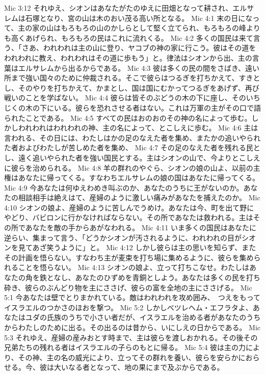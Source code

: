 Mic 3:12  それゆえ、シオンはあなたがたのゆえに田畑となって耕され、エルサレムは石塚となり、宮の山は木のおい茂る高い所となる。
Mic 4:1  末の日になって、主の家の山はもろもろの山のかしらとして堅く立てられ、もろもろの峰よりも高くあげられ、もろもろの民はこれに流れくる。
Mic 4:2  多くの国民は来て言う、「さあ、われわれは主の山に登り、ヤコブの神の家に行こう。彼はその道をわれわれに教え、われわれはその道に歩もう」と。律法はシオンから出、主の言葉はエルサレムから出るからである。
Mic 4:3  彼は多くの民の間をさばき、遠い所まで強い国々のために仲裁される。そこで彼らはつるぎを打ちかえて、すきとし、そのやりを打ちかえて、かまとし、国は国にむかってつるぎをあげず、再び戦いのことを学ばない。
Mic 4:4  彼らは皆そのぶどうの木の下に座し、そのいちじくの木の下にいる。彼らを恐れさせる者はない。これは万軍の主がその口で語られたことである。
Mic 4:5  すべての民はおのおのその神の名によって歩む。しかしわれわれはわれわれの神、主の名によって、とこしえに歩む。
Mic 4:6  主は言われる、その日には、わたしはかの足のなえた者を集め、またかの追いやられた者およびわたしが苦しめた者を集め、
Mic 4:7  その足のなえた者を残れる民とし、遠く追いやられた者を強い国民とする。主はシオンの山で、今よりとこしえに彼らを治められる。
Mic 4:8  羊の群れのやぐら、シオンの娘の山よ、以前の主権はあなたに帰ってくる。すなわちエルサレムの娘の国はあなたに帰ってくる。
Mic 4:9  今あなたは何ゆえわめき叫ぶのか、あなたのうちに王がないのか。あなたの相談相手は絶えはて、産婦のように激しい痛みがあなたを捕えたのか。
Mic 4:10  シオンの娘よ、産婦のように苦しんでうめけ。あなたは今、町を出て野にやどり、バビロンに行かなければならない。その所であなたは救われる。主はその所であなたを敵の手からあがなわれる。
Mic 4:11  いま多くの国民はあなたに逆らい、集まって言う、「どうかシオンが汚されるように、われわれの目がシオンを見てあざ笑うように」と。
Mic 4:12  しかし彼らは主の思いを知らず、またその計画を悟らない。すなわち主が麦束を打ち場に集めるように、彼らを集められることを悟らない。
Mic 4:13  シオンの娘よ、立って打ちこなせ。わたしはあなたの角を鉄となし、あなたのひずめを青銅としよう。あなたは多くの民を打ち砕き、彼らのぶんどり物を主にささげ、彼らの富を全地の主にささげる。
Mic 5:1  今あなたは壁でとりまかれている。敵はわれわれを攻め囲み、　つえをもってイスラエルのつかさのほおを撃つ。
Mic 5:2  しかしベツレヘム・エフラタよ、あなたはユダの氏族のうちで小さい者だが、イスラエルを治める者があなたのうちからわたしのために出る。その出るのは昔から、いにしえの日からである。
Mic 5:3  それゆえ、産婦の産みおとす時まで、主は彼らを渡しおかれる。その後その兄弟たちの残れる者はイスラエルの子らのもとに帰る。
Mic 5:4  彼は主の力により、その神、主の名の威光により、立ってその群れを養い、彼らを安らかにおらせる。今、彼は大いなる者となって、地の果にまで及ぶからである。
